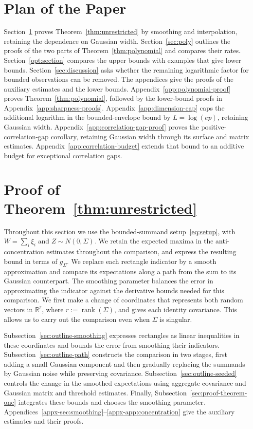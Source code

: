\documentclass[11pt,letterpaper]{article}
\newenvironment{recovered}{}{}
\newcommand{\vSix}[1]{{\color{magenta}#1}}
\theoremstyle{remark}
\newcommand{\R}{\mathbb R}
\begin{document}
\section*{Plan of the Paper}
\vSix{Section~\ref{sec:smoothing} proves Theorem~\ref{thm:unrestricted}
by smoothing and interpolation, retaining the dependence on Gaussian width.}
{Section~\ref{sec:poly} outlines the proofs of the two
parts of Theorem~\ref{thm:polynomial} and compares their rates.}
Section~\ref{opt:section} compares the upper bounds with examples that
give lower bounds. Section~\ref{sec:discussion} asks whether the remaining
logarithmic factor for bounded observations can be removed. The appendices
give the proofs of the auxiliary estimates and the lower bounds.
{Appendix~\ref{app:polynomial-proof} proves
Theorem~\ref{thm:polynomial}, followed by the lower-bound proofs in
Appendix~\ref{app:sharpness-proofs}.}
Appendix~\ref{app:dimension-cap} caps the additional logarithm in the
bounded-envelope bound by \(L=\log(ep)\), retaining Gaussian width.
Appendix~\ref{app:correlation-gap-proof} proves the positive-correlation-gap
corollary, retaining Gaussian width through its surface and matrix estimates.
Appendix~\ref{app:correlation-budget} extends that bound to an additive
budget for exceptional correlation gaps.

\section{\vSix{Proof of Theorem~\ref*{thm:unrestricted}}}\label{sec:smoothing}
Throughout this section we use the bounded-summand setup~\eqref{eq:setup},
with \(W=\sum_i\xi_i\) and \(Z\sim N(0,\Sigma)\).
\vSix{We retain the expected maxima in the anti-concentration estimates
throughout the comparison, and express the resulting bound in terms
of \(g_\Sigma\).}
We replace each rectangle indicator by a smooth approximation and compare
its expectations along a path from the sum to its Gaussian counterpart.
The smoothing parameter balances the error in approximating the indicator
against the derivative bounds needed for this comparison.
We first make a change of coordinates that represents both random vectors
in \(\R^r\), where \(r:=\operatorname{rank}(\Sigma)\), and gives each
identity covariance. This allows us to carry out the comparison even
when \(\Sigma\) is singular.

\begin{recovered}
Subsection~\ref{sec:outline-smoothing} expresses rectangles as linear
inequalities in these coordinates and bounds the error from smoothing
their indicators. Subsection~\ref{sec:outline-path} constructs the
comparison in two stages, first adding a small Gaussian component and
then gradually replacing the summands by Gaussian noise while preserving
covariance. Subsection~\ref{sec:outline-seeded} controls the change in
the smoothed expectations using aggregate covariance and Gaussian matrix
and threshold estimates. Finally, Subsection~\ref{sec:proof-theorem-one}
integrates these bounds and chooses the smoothing parameter.
Appendices~\ref{appx-sec:smoothing}--\ref{appx-app:concentration}
give the auxiliary estimates and their proofs.
\end{recovered}
\end{document}
